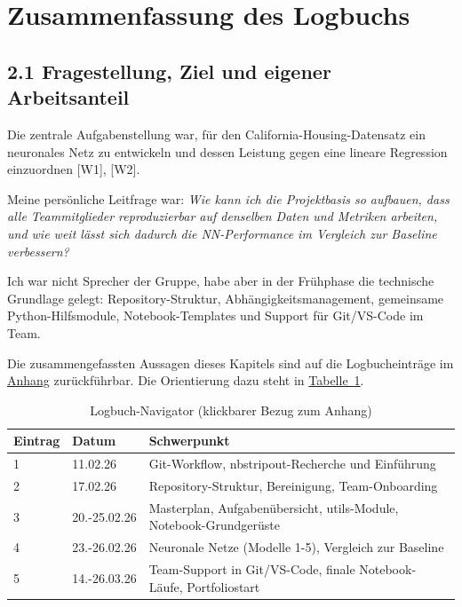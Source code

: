 \documentclass[11pt,a4paper,ngerman,openany]{report}
\begin{document}
\clearpage
\hypersetup{pageanchor=true}
\setcounter{page}{1}

\section{Zusammenfassung des Logbuchs}
\label{sec:zusammenfassung}

\subsection*{2.1 Fragestellung, Ziel und eigener Arbeitsanteil}
Die zentrale Aufgabenstellung war, f\"ur den California-Housing-Datensatz ein neuronales Netz zu entwickeln und dessen Leistung gegen eine lineare Regression einzuordnen [W1], [W2].

Meine pers\"onliche Leitfrage war: \textit{Wie kann ich die Projektbasis so aufbauen, dass alle Teammitglieder reproduzierbar auf denselben Daten und Metriken arbeiten, und wie weit l\"asst sich dadurch die NN-Performance im Vergleich zur Baseline verbessern?}

Ich war nicht Sprecher der Gruppe, habe aber in der Fr\"uhphase die technische Grundlage gelegt: Repository-Struktur, Abh\"angigkeitsmanagement, gemeinsame Python-Hilfsmodule, Notebook-Templates und Support f\"ur Git/VS-Code im Team.

Die zusammengefassten Aussagen dieses Kapitels sind auf die Logbucheintr\"age im \hyperref[sec:logbuch-anhang]{Anhang} zur\"uckf\"uhrbar. Die Orientierung dazu steht in \hyperref[tab:logbuch-navigator]{Tabelle~\ref*{tab:logbuch-navigator}}.

\begin{table}[H]
\centering
\caption{Logbuch-Navigator (klickbarer Bezug zum Anhang)}
\label{tab:logbuch-navigator}
\begin{tabular}{p{1.5cm}p{2.3cm}p{8.2cm}}
\toprule
Eintrag & Datum & Schwerpunkt \\
\midrule
1 & 11.02.26 & Git-Workflow, nbstripout-Recherche und Einf\"uhrung \\
2 & 17.02.26 & Repository-Struktur, Bereinigung, Team-Onboarding \\
3 & 20.-25.02.26 & Masterplan, Aufgaben\"ubersicht, utils-Module, Notebook-Grundger\"uste \\
4 & 23.-26.02.26 & Neuronale Netze (Modelle 1-5), Vergleich zur Baseline \\
5 & 14.-26.03.26 & Team-Support in Git/VS-Code, finale Notebook-L\"aufe, Portfoliostart \\
\bottomrule
\end{tabular}
\end{table}
\end{document}
